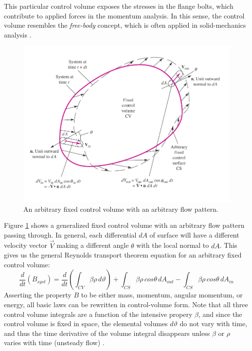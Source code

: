 \documentclass[11pt]{article} %
\numberwithin{equation}{section} %
\begin{document}
This particular control volume exposes the stresses in the flange bolts, which contribute to applied forces in the momentum analysis. In this sense, the control volume resembles the \textit{free-body} concept, which is often applied in solid-mechanics analysis \cite{fluid-mechanics}.
\begin{figure}[h] \label{fig:control-volume}
\centering
\includegraphics[scale=0.5]{control_volume}
\caption{An arbitrary fixed control volume with an arbitrary flow pattern.}
\end{figure}

Figure \ref{fig:control-volume} shows a generalized fixed control volume with an arbitrary flow pattern passing through. In general, each differential $dA$ of surface will have a different velocity vector $\vec{V}$ making a different angle $\theta$ with the local normal to $dA$. This gives us the general Reynolds transport theorem equation for an arbitrary fixed control volume:
\begin{equation} \label{eq:long-rtt}
\frac{d}{dt}(B_{syst}) = \frac{d}{dt} \left( \int_{CV} \beta \rho\, d\vartheta \right) + \int_{CS} \beta \rho\, cos\theta\, dA_{out} - \int_{CS} \beta \rho\, cos\theta\, dA_{in}
\end{equation}
Asserting the property $B$ to be either mass, momentum, angular momentum, or energy, all basic laws can be rewritten in control-volume form. Note that all three control volume integrals are a function of the intensive propery $\beta$, and since the control volume is fixed in space, the elemental volumes $d\vartheta$ do not vary with time, and thus the time derivative of the volume integral disappears unless $\beta$ or $\rho$ varies with time (unsteady flow) \cite{fluid-mechanics}.
\end{document}
